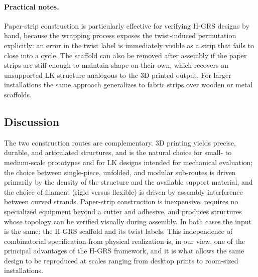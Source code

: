 \documentclass[acmtog]{acmart}
\begin{document}
\paragraph{Practical notes.}
Paper-strip construction is particularly effective for verifying
H-GRS designs by hand, because the wrapping process exposes the
twist-induced permutation explicitly: an error in the twist label
is immediately visible as a strip that fails to close into a cycle.
The scaffold can also be removed after assembly if the paper strips
are stiff enough to maintain shape on their own, which recovers an
unsupported LK structure analogous to the 3D-printed output. For
larger installations the same approach generalizes to fabric strips
over wooden or metal scaffolds.

\subsection{Discussion}

The two construction routes are complementary. 3D printing yields
precise, durable, and articulated structures, and is the natural
choice for small- to medium-scale prototypes and for LK designs
intended for mechanical evaluation; the choice between single-piece,
unfolded, and modular sub-routes is driven primarily by the density
of the structure and the available support material, and the choice
of filament (rigid versus flexible) is driven by assembly
interference between curved strands. Paper-strip construction is
inexpensive, requires no specialized equipment beyond a cutter and
adhesive, and produces structures whose topology can be verified
visually during assembly. In both cases the input is the same: the
H-GRS scaffold and its twist labels. This independence of
combinatorial specification from physical realization is, in our
view, one of the principal advantages of the H-GRS framework, and
it is what allows the same design to be reproduced at scales ranging
from desktop prints to room-sized installations.



\end{document}
